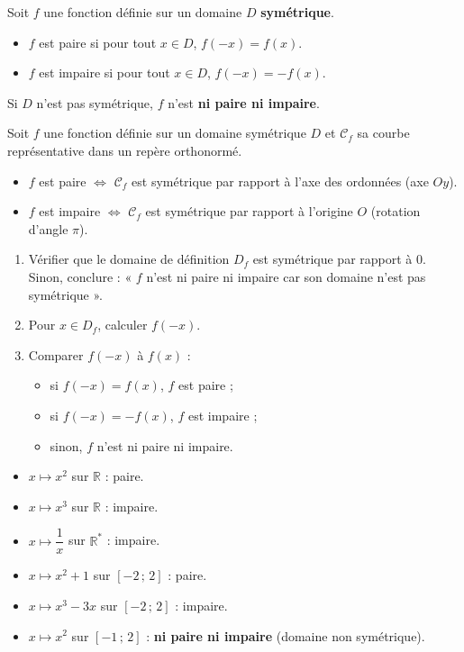 \documentclass[11pt]{article}
\newcommand{\cle}[1]{{\popxbold\color{popdark}#1}}
\begin{document}
\begin{definition}
Soit $f$ une fonction définie sur un domaine $D$ \textbf{symétrique}.
\begin{itemize}
\item $f$ est \cle{paire} si pour tout $x\in D$, $f(-x)=f(x)$.
\item $f$ est \cle{impaire} si pour tout $x\in D$, $f(-x)=-f(x)$.
\end{itemize}
Si $D$ n'est pas symétrique, $f$ n'est \textbf{ni paire ni impaire}.
\end{definition}

\begin{propriete}
Soit $f$ une fonction définie sur un domaine symétrique $D$ et $\mathcal{C}_f$ sa courbe représentative dans un repère orthonormé.
\begin{itemize}
\item $f$ est paire $\iff$ $\mathcal{C}_f$ est symétrique par rapport à l'axe des ordonnées (axe $Oy$).
\item $f$ est impaire $\iff$ $\mathcal{C}_f$ est symétrique par rapport à l'origine $O$ (rotation d'angle $\pi$).
\end{itemize}
\end{propriete}

\begin{methode}
\begin{enumerate}
\item Vérifier que le domaine de définition $D_f$ est symétrique par rapport à $0$. Sinon, conclure : « $f$ n'est ni paire ni impaire car son domaine n'est pas symétrique ».
\item Pour $x\in D_f$, calculer $f(-x)$.
\item Comparer $f(-x)$ à $f(x)$ :
\begin{itemize}
\item si $f(-x)=f(x)$, $f$ est paire ;
\item si $f(-x)=-f(x)$, $f$ est impaire ;
\item sinon, $f$ n'est ni paire ni impaire.
\end{itemize}
\end{enumerate}
\end{methode}

\begin{exemplebox}
\begin{itemize}
\item $x\mapsto x^2$ sur $\mathbb{R}$ : paire.
\item $x\mapsto x^3$ sur $\mathbb{R}$ : impaire.
\item $x\mapsto \dfrac{1}{x}$ sur $\mathbb{R}^*$ : impaire.
\item $x\mapsto x^2+1$ sur $[-2\,;\,2]$ : paire.
\item $x\mapsto x^3-3x$ sur $[-2\,;\,2]$ : impaire.
\item $x\mapsto x^2$ sur $[-1\,;\,2]$ : \textbf{ni paire ni impaire} (domaine non symétrique).
\end{itemize}
\end{exemplebox}
\end{document}

